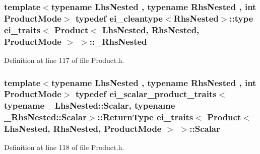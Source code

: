 \hypertarget{structei__traits_3_01_product_3_01_lhs_nested_00_01_rhs_nested_00_01_product_mode_01_4_01_4_ae80ff0cd7f36460284383cf28e007eca}{
\subsubsection[{\-\_\-\-Rhs\-Nested}]{\setlength{\rightskip}{0pt plus 5cm}template$<$typename Lhs\-Nested , typename Rhs\-Nested , int Product\-Mode$>$ typedef {\bf ei\-\_\-cleantype}$<$Rhs\-Nested$>$\-::{\bf type} {\bf ei\-\_\-traits}$<$ {\bf Product}$<$ Lhs\-Nested, Rhs\-Nested, Product\-Mode $>$ $>$\-::{\bf \-\_\-\-Rhs\-Nested}}}\label{structei__traits_3_01_product_3_01_lhs_nested_00_01_rhs_nested_00_01_product_mode_01_4_01_4_ae80ff0cd7f36460284383cf28e007eca}


Definition at line 117 of file Product.\-h.

\hypertarget{structei__traits_3_01_product_3_01_lhs_nested_00_01_rhs_nested_00_01_product_mode_01_4_01_4_a565565d97c9296ca348f303e3859dce2}{
\subsubsection[{Scalar}]{\setlength{\rightskip}{0pt plus 5cm}template$<$typename Lhs\-Nested , typename Rhs\-Nested , int Product\-Mode$>$ typedef {\bf ei\-\_\-scalar\-\_\-product\-\_\-traits}$<$typename \-\_\-\-Lhs\-Nested\-::\-Scalar, typename \-\_\-\-Rhs\-Nested\-::\-Scalar$>$\-::Return\-Type {\bf ei\-\_\-traits}$<$ {\bf Product}$<$ Lhs\-Nested, Rhs\-Nested, Product\-Mode $>$ $>$\-::{\bf Scalar}}}\label{structei__traits_3_01_product_3_01_lhs_nested_00_01_rhs_nested_00_01_product_mode_01_4_01_4_a565565d97c9296ca348f303e3859dce2}


Definition at line 118 of file Product.\-h.



